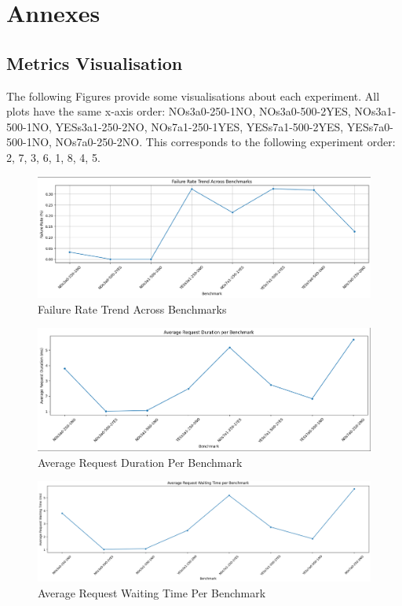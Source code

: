 \documentclass[runningheads]{llncs}
\begin{document}
\section{Annexes}



\subsection{Metrics Visualisation}
The following Figures provide some visualisations about each experiment. All plots have the same x-axis order: NOs3a0-250-1NO, NOs3a0-500-2YES, NOs3a1-500-1NO,  YESs3a1-250-2NO, NOs7a1-250-1YES, YESs7a1-500-2YES,  YESs7a0-500-1NO, NOs7a0-250-2NO. This corresponds to the following experiment order: 2, 7, 3, 6, 1, 8, 4, 5.

\begin{figure}[H]
    \centering
    \includegraphics[width=1\textwidth]{media/FailureRate_trend.png} \caption{Failure Rate Trend Across Benchmarks}
    \label{fig:aaa}
\end{figure}

\begin{figure}[H]
    \centering
    \includegraphics[width=1\textwidth]{media/Avg_req_duration.png} \caption{Average Request Duration Per Benchmark}
    \label{fig:bb}
\end{figure}

\begin{figure}[H]
    \centering
    \includegraphics[width=1\textwidth]{media/Avg_req_waitingtime.png} \caption{Average Request Waiting Time Per Benchmark}
    \label{fig:cc}
\end{figure}
\end{document}
